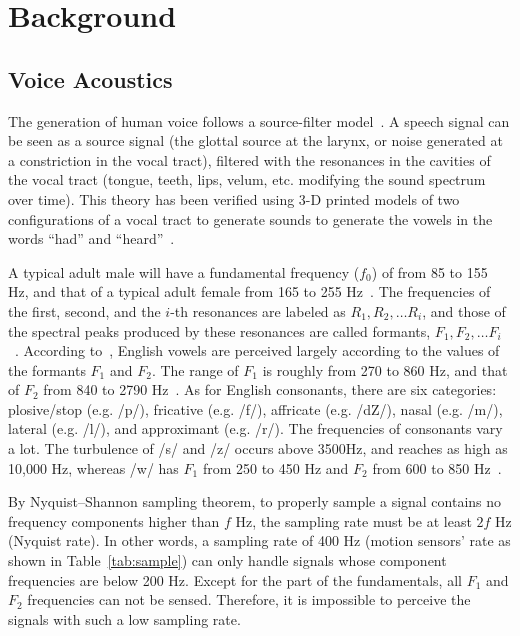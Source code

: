 
\section{Background}\label{sec:background}

\subsection{Voice Acoustics}\label{sec:voice}

The generation of human voice follows a source-filter model~\cite{fant1960acoustic}. A speech signal can be seen as a source signal (the glottal source at the larynx, or noise generated at a constriction in the vocal tract), filtered with the resonances in the cavities of the vocal tract (tongue, teeth, lips, velum, etc. modifying the sound spectrum over time). This theory has been verified using 3-D printed models of two configurations of a vocal tract to generate sounds to generate the vowels in the words ``had'' and ``heard''~\cite{wolfe2016experimentally}. 


A typical adult male will have a fundamental frequency  ($f_0$) of from 85 to 155 Hz, and that of a typical adult female from 165 to 255 Hz~\cite{baken1987clinical,titze1994principles}. The frequencies of the first, second, and the $i$-th resonances are labeled as  $R_1, R_2, \ldots R_i$, and those of the spectral peaks produced by these resonances are called formants, $F_1, F_2, \ldots F_i $~\cite{titze2015toward}. 
%
According to~\cite{ladefoged2014course}, English vowels are perceived largely according to the values of the formants $F_1$ and $F_2$. The range of $F_1$ is roughly from 270 to 860 Hz, and that of $F_2$ from 840 to 2790 Hz~\cite{peterson1952control}. As for English consonants, there are six categories: plosive/stop (e.g. /p/), fricative (e.g. /f/), affricate (e.g. /dZ/), nasal (e.g. /m/), lateral (e.g. /l/), and approximant (e.g. /r/). The frequencies of consonants vary a lot. The turbulence of /s/ and /z/ occurs above 3500Hz, and reaches as high as 10,000 Hz, whereas /w/ has $F_1$ from 250 to 450 Hz and $F_2 $ from 600 to 850 Hz~\cite{ladefoged2012vowels}. 

By Nyquist–Shannon sampling theorem, to properly sample a signal contains no frequency components higher than $f$ Hz, the sampling rate must be at least $2f$ Hz (Nyquist rate). In other words, a sampling rate of 400 Hz (motion sensors' rate as shown in Table~\ref{tab:sample}) can only handle signals whose component frequencies are below 200 Hz. Except for the part of the fundamentals, all $F_1$ and $F_2$ frequencies can not be sensed. Therefore, it is impossible to perceive the signals with such a low sampling rate.
%



